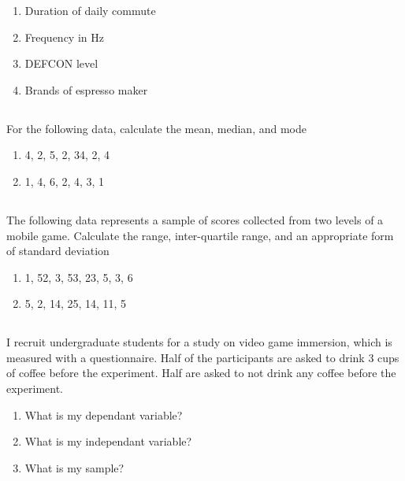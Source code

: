 \documentclass[twocolumn]{article}
\begin{document}
    \begin{enumerate}
        \item Duration of daily commute
        \item Frequency in Hz
        \item DEFCON level
        \item Brands of espresso maker
    \end{enumerate}

\subsection{}

    For the following data, calculate the mean, median, and mode

    \begin{enumerate}
        \item 4, 2, 5, 2, 34, 2, 4
        \item 1, 4, 6, 2, 4, 3, 1
    \end{enumerate}

\subsection{}

    The following data represents a sample of scores collected from two levels of a mobile game. Calculate the range, inter-quartile range, and an appropriate form of standard deviation 

    \begin{enumerate}
        \item 1, 52, 3, 53, 23, 5, 3, 6
        \item 5, 2, 14, 25, 14, 11, 5
    \end{enumerate}

\subsection{}

    I recruit undergraduate students for a study on video game immersion, which is measured with a questionnaire. Half of the participants are asked to drink 3 cups of coffee before the experiment. Half are asked to not drink any coffee before the experiment.
    
    \begin{enumerate}
        \item What is my dependant variable?
        \item What is my independant variable?
        \item What is my sample?
    \end{enumerate}
\end{document}
